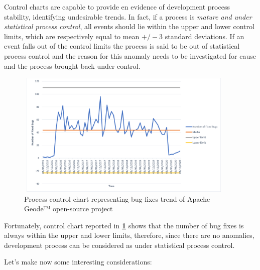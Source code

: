\documentclass[sigconf]{acmart}
\begin{document}
Control charts are capable to provide en evidence of development process stability, identifying undesirable trends. In fact, if a process is \textit{mature and under statistical process control}, all events should lie within the upper and lower control limits, which are respectively equal to mean $+/-3$ standard deviations. If an event falls out of the control limits the process is said to be out of statistical process control and the reason for this anomaly needs to be investigated for cause and the process brought back under control\cite{FLORENCE}. 

\begin{figure}[h!]
  \centering
  \includegraphics[width=10.5cm, height=6cm]{./ProcessControlChart.png}
  \caption{Process control chart representing bug-fixes trend of Apache Geode™ open-source project}
  \label{ProcessControl}
\end{figure}

Fortunately, control chart reported in \textbf{\cref{ProcessControl}} shows that the number of bug fixes is always within the upper and lower limits, therefore, since there are no anomalies, development process can be considered as under statistical process control.

Let's make now some interesting considerations:
\end{document}
